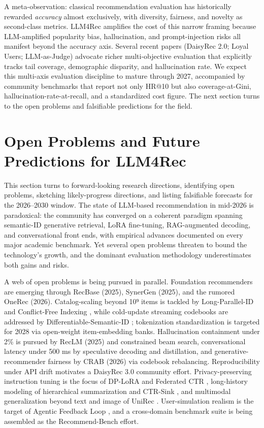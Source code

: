 \documentclass{article}
\begin{document}
A meta-observation: classical recommendation evaluation has historically rewarded \emph{accuracy} almost exclusively, with diversity, fairness, and novelty as second-class metrics. LLM4Rec amplifies the cost of this narrow framing because LLM-amplified popularity bias, hallucination, and prompt-injection risks all manifest beyond the accuracy axis. Several recent papers (DaisyRec 2.0; Loyal Users; LLM-as-Judge) advocate richer multi-objective evaluation that explicitly tracks tail coverage, demographic disparity, and hallucination rate. We expect this multi-axis evaluation discipline to mature through 2027, accompanied by community benchmarks that report not only HR@10 but also coverage-at-Gini, hallucination-rate-at-recall, and a standardized cost figure. The next section turns to the open problems and falsifiable predictions for the field.

\section{Open Problems and Future Predictions for LLM4Rec}\label{open-problems-and-future-predictions-for-llm4rec}

This section turns to forward-looking research directions, identifying open problems, sketching likely-progress directions, and listing falsifiable forecasts for the 2026--2030 window. The state of LLM-based recommendation in mid-2026 is paradoxical: the community has converged on a coherent paradigm spanning semantic-ID generative retrieval, LoRA fine-tuning, RAG-augmented decoding, and conversational front ends, with empirical advances documented on every major academic benchmark. Yet several open problems threaten to bound the technology's growth, and the dominant evaluation methodology underestimates both gains and risks.

A web of open problems is being pursued in parallel. Foundation recommenders are emerging through RecBase (2025), SynerGen (2025), and the rumored OneRec (2026). Catalog-scaling beyond 10⁹ items is tackled by Long-Parallel-ID \citep{hou2025generatinglongsema} and Conflict-Free Indexing \citep{zhang2025purelysemanticinde}, while cold-update streaming codebooks are addressed by Differentiable-Semantic-ID \citep{fu2026differentiablesema}; tokenization standardization is targeted for 2028 via open-weight item-embedding banks. Hallucination containment under 2\% is pursued by RecLM (2025) and constrained beam search, conversational latency under 500 ms by speculative decoding and distillation, and generative-recommender fairness by CRAB (2026) via codebook rebalancing. Reproducibility under API drift motivates a DaisyRec 3.0 community effort. Privacy-preserving instruction tuning is the focus of DP-LoRA \citep{yu2021differentiallypriv} and Federated CTR \citep{qin2025federatedcrossdoma}, long-history modeling of hierarchical summarization \citep{geng2024breakingthelengthb} and CTR-Sink \citep{li2025grefergraphretriev}, and multimodal generalization beyond text and image of UniRec \citep{lei2026unirecunifiedmulti}. User-simulation realism is the target of Agentic Feedback Loop \citep{cai2024agenticfeedbackloo}, and a cross-domain benchmark suite is being assembled as the Recommend-Bench effort.
\end{document}
